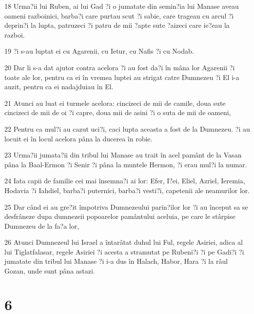 \par 18 Urma?ii lui Ruben, ai lui Gad ?i o jumatate din semin?ia lui Manase aveau oameni razboinici, barba?i care purtau scut ?i sabie, care trageau cu arcul ?i deprin?i la lupta, patruzeci ?i patru de mii ?apte sute ?aizeci care ie?eau la razboi.
\par 19 ?i s-au luptat ei cu Agarenii, cu Ietur, cu Nafis ?i cu Nodab.
\par 20 Dar li s-a dat ajutor contra acelora ?i au fost da?i în mâna lor Agarenii ?i toate ale lor, pentru ca ei în vremea luptei au strigat catre Dumnezeu ?i El i-a auzit, pentru ca ei nadajduiau în El.
\par 21 Atunci au luat ei turmele acelora: cincizeci de mii de camile, doua sute cincizeci de mii de oi ?i capre, doua mii de asini ?i o suta de mii de oameni,
\par 22 Pentru ca mul?i au cazut uci?i, caci lupta aceasta a fost de la Dumnezeu. ?i au locuit ei în locul acelora pâna la ducerea în robie.
\par 23 Urma?ii jumata?ii din tribul lui Manase au trait în acel pamânt de la Vasan pâna la Baal-Ermon ?i Senir ?i pâna la muntele Hermon, ?i erau mul?i la numar.
\par 24 Iata capii de familie cei mai însemna?i ai lor: Efer, I?ei, Eliel, Azriel, Ieremia, Hodavia ?i Iahdiel, barba?i puternici, barba?i vesti?i, capetenii ale neamurilor lor.
\par 25 Dar când ei au gre?it împotriva Dumnezeului parin?ilor lor ?i au început sa se desfrâneze dupa dumnezeii popoarelor pamântului aceluia, pe care le stârpise Dumnezeu de la fa?a lor,
\par 26 Atunci Dumnezeul lui Israel a întarâtat duhul lui Ful, regele Asiriei, adica al lui Tiglatfalasar, regele Asiriei ?i acesta a stramutat pe Rubeni?i ?i pe Gadi?i ?i jumatate din tribul lui Manase ?i i-a dus în Halach, Habor, Hara ?i la râul Gozan, unde sunt pâna astazi.

\chapter{6}

